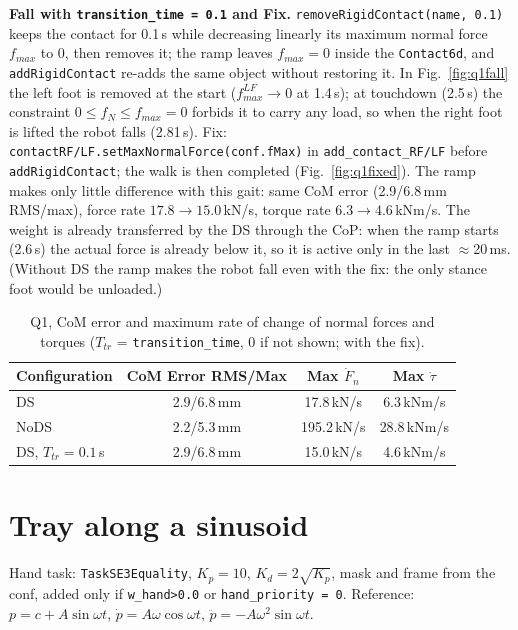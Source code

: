 \documentclass[10pt,a4paper]{article}
\newcommand{\fig}[1]{Fig.~\ref{fig:#1}}
\newcommand{\code}[1]{\texttt{#1}}
\begin{document}
\textbf{Fall with \code{transition\_time = 0.1} and Fix.} \code{removeRigidContact(name, 0.1)} keeps the contact for 0.1\,s while decreasing linearly its maximum normal force $f_{max}$ to 0, then removes it; the ramp leaves $f_{max}=0$ inside the \code{Contact6d}, and \code{addRigidContact} re-adds the same object without restoring it. In \fig{q1fall} the left foot is removed at the start ($f_{max}^{LF}\to0$ at 1.4\,s); at touchdown (2.5\,s) the constraint $0\le f_N\le f_{max}=0$ forbids it to carry any load, so when the right foot is lifted the robot falls (2.81\,s). Fix: \code{contactRF/LF.setMaxNormalForce(conf.fMax)} in \code{add\_contact\_RF/LF} before \code{addRigidContact}; the walk is then completed (\fig{q1fixed}). The ramp makes only little difference with this gait: same CoM error (2.9/6.8\,mm RMS/max), force rate $17.8\to15.0$\,kN/s, torque rate $6.3\to4.6$\,kNm/s. The weight is already transferred by the DS through the CoP: when the ramp starts (2.6\,s) the actual force is already below it, so it is active only in the last $\approx$20\,ms. (Without DS the ramp makes the robot fall even with the fix: the only stance foot would be unloaded.)

\begin{table}[H]
  \centering\small
  \begin{tabular}{lccc}
    \toprule
    Configuration         & CoM Error RMS/Max & Max $\dot{F}_n$ & Max $\dot{\tau}$ \\
    \midrule
    DS                    & 2.9/6.8\,mm       & 17.8\,kN/s      & 6.3\,kNm/s       \\
    NoDS                  & 2.2/5.3\,mm       & 195.2\,kN/s     & 28.8\,kNm/s      \\
    DS, $T_{tr} = 0.1$\,s & 2.9/6.8\,mm       & 15.0\,kN/s      & 4.6\,kNm/s       \\
    \bottomrule
  \end{tabular}
  \caption{Q1, CoM error and maximum rate of change of normal forces and torques ($T_{tr}$ = \code{transition\_time}, 0 if not shown; with the fix).}
  \label{table:Q1}
\end{table}

\section{Tray along a sinusoid}
Hand task: \code{TaskSE3Equality}, $K_p=10$, $K_d=2\sqrt{K_p}$, mask and frame from the conf, added only if \code{w\_hand>0.0} or \code{hand\_priority = 0}. Reference: $p=c+A\sin\omega t$, $\dot p = A\omega\cos\omega t$, $\ddot p=-A\omega^2\sin\omega t$.
\end{document}
